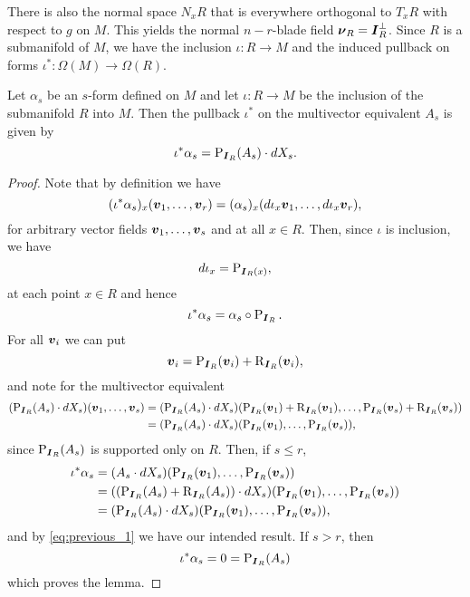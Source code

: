 There is also the normal space $N_x R$ that is everywhere orthogonal to $T_x R$ with respect to $g$ on $M$. This yields the normal $n-r$-blade field $\boldsymbol{\nu}_R = \boldsymbol{I}_R^\perp$. Since $R$ is a submanifold of $M$, we have the inclusion $\iota \colon R \to M$ and the induced pullback on forms $\iota^* \colon \Omega(M) \to \Omega(R)$. 
\begin{lemma}
Let $\alpha_s$ be an $s$-form defined on $M$ and let $\iota \colon R \to M$ be the inclusion of the submanifold $R$ into $M$. Then the pullback $\iota^*$ on the multivector equivalent $A_s$ is given by
\begin{equation}
\iota^* \alpha_s = \operatorname{P}_{\boldsymbol{I}_R}(A_s) \cdot dX_s.
\end{equation}
\end{lemma}
\begin{proof}
Note that by definition we have
\[
(\iota^* \alpha_s)_x (\boldsymbol{v}_1,\dots,\boldsymbol{v}_r) = (\alpha_s)_x(d\iota_x\boldsymbol{v}_1,\dots, d\iota_x\boldsymbol{v}_r ),
\]
for arbitrary vector fields $\boldsymbol{v}_1,\dots,\boldsymbol{v}_s$ and at all $x\in R$. Then, since $\iota$ is inclusion, we have
\[
d\iota_x = \operatorname{P}_{\boldsymbol{I}_R(x)},
\]
at each point $x \in R$ and hence
\[
\iota^* \alpha_s = \alpha_s \circ \operatorname{P}_{\boldsymbol{I}_R}.
\]
For all $\boldsymbol{v}_i$ we can put
\[
\boldsymbol{v}_i = \operatorname{P}_{\boldsymbol{I}_R}(\boldsymbol{v}_i) + \operatorname{R}_{\boldsymbol{I}_R}(\boldsymbol{v}_i),
\]
and note for the multivector equivalent
\begin{align}
\label{eq:previous_1}
(\operatorname{P}_{\boldsymbol{I}_R}(A_s) \cdot dX_s)(\boldsymbol{v}_1,\dots,\boldsymbol{v}_s) &= (\operatorname{P}_{\boldsymbol{I}_R}(A_s) \cdot dX_s)(\operatorname{P}_{\boldsymbol{I}_R}(\boldsymbol{v}_1) + \operatorname{R}_{\boldsymbol{I}_R}(\boldsymbol{v}_1),\dots,\operatorname{P}_{\boldsymbol{I}_R}(\boldsymbol{v}_s) + \operatorname{R}_{\boldsymbol{I}_R}(\boldsymbol{v}_s))\\
&= (\operatorname{P}_{\boldsymbol{I}_R}(A_s) \cdot dX_s)(\operatorname{P}_{\boldsymbol{I}_R}(\boldsymbol{v}_1),\dots,\operatorname{P}_{\boldsymbol{I}_R}(\boldsymbol{v}_s)),
\end{align}
since $\operatorname{P}_{\boldsymbol{I}_R}(A_s)$ is supported only on $R$. Then, if $s\leq r$,
\begin{align*}
\iota^*\alpha_s &= (A_s \cdot dX_s)(\operatorname{P}_{\boldsymbol{I}_R}(\boldsymbol{v}_1),\dots,\operatorname{P}_{\boldsymbol{I}_R}(\boldsymbol{v}_s))\\
&= ((\operatorname{P}_{\boldsymbol{I}_R}(A_s) + \operatorname{R}_{\boldsymbol{I}_R}(A_s)) \cdot dX_s)(\operatorname{P}_{\boldsymbol{I}_R}(\boldsymbol{v}_1),\dots,\operatorname{P}_{\boldsymbol{I}_R}(\boldsymbol{v}_s))\\
&= (\operatorname{P}_{\boldsymbol{I}_R}(A_s) \cdot dX_s)(\operatorname{P}_{\boldsymbol{I}_R}(\boldsymbol{v}_1),\dots,\operatorname{P}_{\boldsymbol{I}_R}(\boldsymbol{v}_s)),
\end{align*}
and by \cref{eq:previous_1} we have our intended result. If $s>r$, then 
\[
\iota^* \alpha_s = 0 = \operatorname{P}_{\boldsymbol{I}_R}(A_s)
\]
which proves the lemma.
\end{proof}

